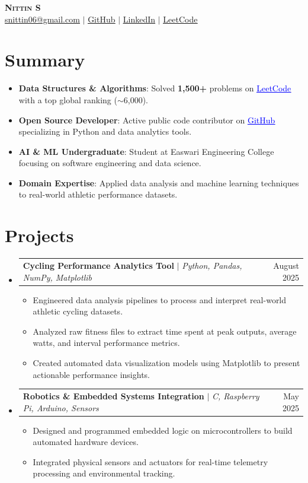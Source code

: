 \documentclass[letterpaper,11pt]{article}
\makeatletter
\newcommand{\resumeItem}[1]{
  \item\small{
    {#1 \vspace{-2pt}}
  }
}
\newcommand{\resumeProjectHeading}[2]{
    \item
    \begin{tabular*}{0.97\textwidth}{l@{\extracolsep{\fill}}r}
      \small#1 & #2 \\
    \end{tabular*}\vspace{-7pt}
}
\newcommand{\resumeSubHeadingListStart}{\begin{itemize}[leftmargin=0.15in, label={}]}
\newcommand{\resumeSubHeadingListEnd}{\end{itemize}}
\newcommand{\resumeItemListStart}{\begin{itemize}}
\newcommand{\resumeItemListEnd}{\end{itemize}\vspace{-5pt}}
\makeatother
\begin{document}


\begin{center}
    \textbf{\Huge \scshape Nittin S} \\ \vspace{1pt}
    \small \href{mailto:snittin06@gmail.com}{\underline{snittin06@gmail.com}} $|$ 
    \href{https://github.com/clay2113}{\underline{GitHub}} $|$
    \href{https://www.linkedin.com/in/nittin-s-b7569730b/}{\underline{LinkedIn}} $|$
    \href{https://leetcode.com/u/nittins}{\underline{LeetCode}}
\end{center}

\section{Summary}
  \resumeItemListStart
    \resumeItem{\textbf{Data Structures \& Algorithms}: Solved \textbf{1,500+} problems on \href{https://leetcode.com/u/nittins}{\textcolor{blue}{\underline{LeetCode}}} with a top global ranking ($\sim$6,000).}
    \resumeItem{\textbf{Open Source Developer}: Active public code contributor on \href{https://github.com/clay2113}{\textcolor{blue}{\underline{GitHub}}} specializing in Python and data analytics tools.}
    \resumeItem{\textbf{AI \& ML Undergraduate}: Student at Easwari Engineering College focusing on software engineering and data science.}
    \resumeItem{\textbf{Domain Expertise}: Applied data analysis and machine learning techniques to real-world athletic performance datasets.}
  \resumeItemListEnd

\section{Projects}
    \resumeSubHeadingListStart
      \resumeProjectHeading
        {\textbf{Cycling Performance Analytics Tool} $|$ \emph{Python, Pandas, NumPy, Matplotlib}}{August 2025}
        \resumeItemListStart
          \resumeItem{Engineered data analysis pipelines to process and interpret real-world athletic cycling datasets.}
          \resumeItem{Analyzed raw fitness files to extract time spent at peak outputs, average watts, and interval performance metrics.}
          \resumeItem{Created automated data visualization models using Matplotlib to present actionable performance insights.}
        \resumeItemListEnd
        
      \resumeProjectHeading
        {\textbf{Robotics \& Embedded Systems Integration} $|$ \emph{C, Raspberry Pi, Arduino, Sensors}}{May 2025}
        \resumeItemListStart
          \resumeItem{Designed and programmed embedded logic on microcontrollers to build automated hardware devices.}
          \resumeItem{Integrated physical sensors and actuators for real-time telemetry processing and environmental tracking.}
        \resumeItemListEnd
    \resumeSubHeadingListEnd
\end{document}
